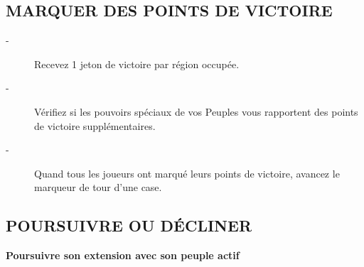 \documentclass{scrartcl}%
\begin{document}
%
\subsection{ MARQUER DES POINTS DE VICTOIRE
}%
\label{subsec:MARQUERDESPOINTSDEVICTOIRE}%
\begin{description}%
\item[{-} ]%
%
 Recevez 1 jeton de victoire par région occupée.
%
\item[{-} ]%
%
 Vérifiez si les pouvoirs spéciaux de vos Peuples vous rapportent des points de victoire supplémentaires.
%
\item[{-} ]%
%
 Quand tous les joueurs ont marqué leurs points de victoire, avancez le marqueur de tour d'une case.
%
\end{description}

%
\subsection{ POURSUIVRE OU DÉCLINER
}%
\label{subsec:POURSUIVREOUDCLINER}%
\textbf{Poursuivre son extension avec son peuple actif}%
\end{document}
